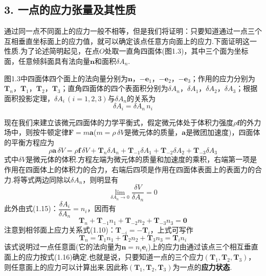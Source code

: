 \subsection*{3. 一点的应力张量及其性质}

通过同一点不同面上的应力一般不相等，但是我们将证明：只要知道通过一点三个互相垂直坐标面上的应力值，就可以确定该点任意方向面上的应力.下面证明这一性质.为了论述简明起见，在点$O$处取一直角四面体(图1.3)，其中三个面为坐标面，任意倾斜面具有法向量$\boldsymbol{n}$和面积$\delta A_n$.

图1.3中四面体四个面上的法向量分别为$\boldsymbol{n}$，$-\boldsymbol{e}_1$，$-\boldsymbol{e}_2$，$-\boldsymbol{e}_3$；作用的应力分别为$\boldsymbol{T}_n$，$\boldsymbol{T}_1$，$\boldsymbol{T}_2$，$\boldsymbol{T}_3$；直角四面体的四个表面积分别为$\delta A_n$，$\delta A_1$，$\delta A_2$，$\delta A_3$；根据面积投影定理，$\delta A_i\,(i=1,2,3)$与$\delta A_n$的关系为
\begin{equation*}
\delta A_i=\delta A_n\, n_i
\tag{1.15}
\end{equation*}

现在我们来建立该微元四面体的力学平衡式，假定微元体处于体积力强度$\rho\boldsymbol{f}$的外力场中，则按牛顿定律$\boldsymbol{F}=m\boldsymbol{a}$($m=\rho\,\delta V$是微元体的质量，$\boldsymbol{a}$是微团加速度)，四面体的平衡方程应为
\[
\rho\boldsymbol{a}\,\delta V=\rho\boldsymbol{f}\,\delta V+\boldsymbol{T}_n\delta A_n+\boldsymbol{T}_{-1}\delta A_1+\boldsymbol{T}_{-2}\delta A_2+\boldsymbol{T}_{-3}\delta A_3
\]
式中$\delta V$是微元体的体积.方程左端为微元体的质量和加速度的乘积，右端第一项是作用在四面体上的体积力的合力，右端后四项是作用在四面体表面上的表面力的合力.将等式两边同除以$\delta A_n$，则明显有
\[
\lim_{\delta A_n\to 0}\frac{\delta V}{\delta A_n}=0
\]
此外由式(1.15)：$\dfrac{\delta A_i}{\delta A_n}=n_i$，因而有
\[
\boldsymbol{T}_n+\boldsymbol{T}_{-1}n_1+\boldsymbol{T}_{-2}n_2+\boldsymbol{T}_{-3}n_3=\boldsymbol{0}
\]
注意到相邻面上应力关系式(1.10)：$\boldsymbol{T}_{-i}=-\boldsymbol{T}_i$，上式可写作
\begin{equation*}
\boldsymbol{T}_n=\boldsymbol{T}_1 n_1+\boldsymbol{T}_2 n_2+\boldsymbol{T}_3 n_3=\boldsymbol{T}_i n_i
\tag{1.16}
\end{equation*}
该式说明过一点任意面(它的法向量为$\boldsymbol{n}=n_i\boldsymbol{e}_i$)上的应力由通过该点三个相互垂直面上的应力按式(1.16)确定.也就是说，只要知道一点的三个应力$(\boldsymbol{T}_1,\boldsymbol{T}_2,\boldsymbol{T}_3)$，则任意面上的应力可以计算出来.因此称$(\boldsymbol{T}_1,\boldsymbol{T}_2,\boldsymbol{T}_3)$为一点的\textbf{应力状态}.

